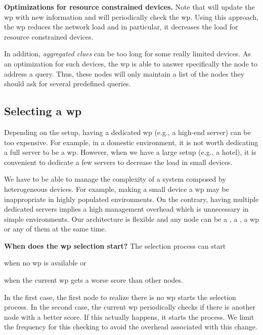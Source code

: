 \noindent\textbf{Optimizations for resource constrained devices.}
Note that \providers{} will update the \ac{wp} with new information and \consumers{} will periodically check the \ac{wp}.
Using this approach, the \ac{wp} reduces the network load and in particular, it decreases the load for resource constrained devices.

In addition, \emph{aggregated clues} can be too long for some really limited devices.
As an optimization for such devices, the \ac{wp} is able to answer specifically the node to address a query.
Thus, these nodes will only maintain a list of the nodes they should ask for several predefined queries.



\subsection{Selecting a \acl{wp}}
\label{sec:selection}
Depending on the setup, having a dedicated \ac{wp} (e.g., a high-end server) can be too expensive.
For example, in a domestic environment, it is not worth dedicating a full server to be a \ac{wp}.
However, when we have a large setup (e.g., a hotel), it is convenient to dedicate a few servers to decrease the load in small devices.

We have to be able to manage the complexity of a system composed by heterogeneous devices.
For example, making a small device a \ac{wp} may be inappropriate in highly populated environments.
On the contrary, having multiple dedicated servers implies a high management overhead which is unnecessary in simple environments.
Our architecture is flexible and any node can be a \provider{}, a \consumer{}, a \ac{wp} or any of them at the same time.

\noindent\textbf{When does the \ac{wp} selection start?}
The selection process can start
\begin{enumerate*}[label=\itshape(\arabic*\upshape)]
  \item when no \ac{wp} is available or
  \item when the current \ac{wp} gets a worse score than other nodes.
\end{enumerate*}
In the first case, the first node to realize there is no \ac{wp} starts the selection process.
In the second case, the current \ac{wp} periodically checks if there is another node with a better score.
If this actually happens, it starts the process.
We limit the frequency for this checking to avoid the overhead associated with this change.

